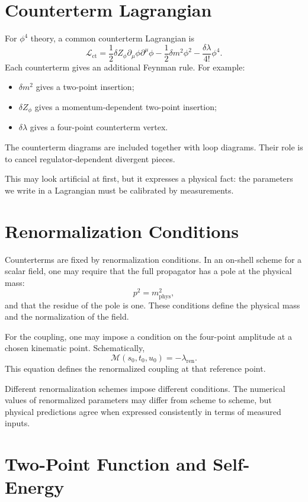 \section{Counterterm Lagrangian}

For \(\phi^4\) theory, a common counterterm Lagrangian is
\[
    \mathcal{L}_{\mathrm{ct}}
    = \frac{1}{2}\delta Z_\phi\partial_\mu\phi\partial^\mu\phi
      -\frac{1}{2}\delta m^2\phi^2
      -\frac{\delta\lambda}{4!}\phi^4.
\]
Each counterterm gives an additional Feynman rule. For example:
\begin{itemize}
    \item \(\delta m^2\) gives a two-point insertion;
    \item \(\delta Z_\phi\) gives a momentum-dependent two-point insertion;
    \item \(\delta\lambda\) gives a four-point counterterm vertex.
\end{itemize}
The counterterm diagrams are included together with loop diagrams. Their role is
to cancel regulator-dependent divergent pieces.

This may look artificial at first, but it expresses a physical fact: the
parameters we write in a Lagrangian must be calibrated by measurements.

\section{Renormalization Conditions}

Counterterms are fixed by renormalization conditions. In an on-shell scheme for a
scalar field, one may require that the full propagator has a pole at the physical
mass:
\[
    p^2=m_{\mathrm{phys}}^2,
\]
and that the residue of the pole is one. These conditions define the physical
mass and the normalization of the field.

For the coupling, one may impose a condition on the four-point amplitude at a
chosen kinematic point. Schematically,
\[
    \mathcal{M}(s_0,t_0,u_0)=-\lambda_{\mathrm{ren}}.
\]
This equation defines the renormalized coupling at that reference point.

Different renormalization schemes impose different conditions. The numerical
values of renormalized parameters may differ from scheme to scheme, but physical
predictions agree when expressed consistently in terms of measured inputs.

\section{Two-Point Function and Self-Energy}

